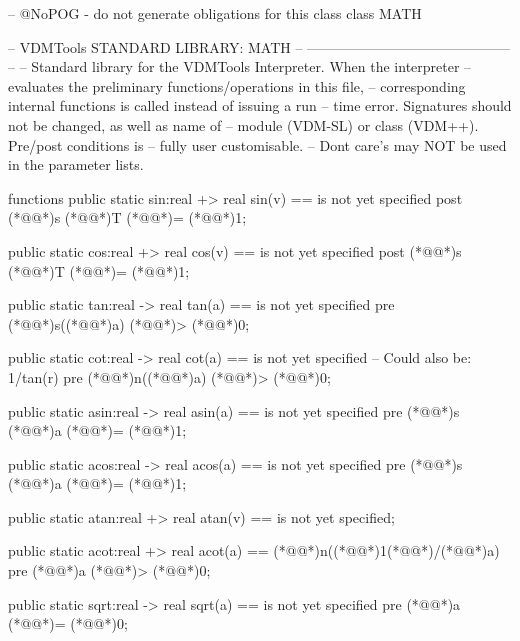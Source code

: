 \documentclass[a4paper]{article}
\begin{document}
\title{}
\author{}
\begin{vdm_al}
-- @NoPOG - do not generate obligations for this class
class MATH

--  VDMTools STANDARD LIBRARY: MATH
--      --------------------------------------------
-- 
-- Standard library for the VDMTools Interpreter. When the interpreter
-- evaluates the preliminary functions/operations in this file,
-- corresponding internal functions is called instead of issuing a run
-- time error. Signatures should not be changed, as well as name of
-- module (VDM-SL) or class (VDM++). Pre/post conditions is 
-- fully user customisable. 
-- Dont care's may NOT be used in the parameter lists.

  functions
public static
    sin:real +> real
    sin(v) ==
    is not yet specified    
    post (*@@*)s (*@@*)T (*@\vdmnotcovered{<}@*)= (*@\vdmnotcovered{}@*)1;

public static
    cos:real +> real
    cos(v) ==
    is not yet specified
    post (*@@*)s (*@@*)T (*@\vdmnotcovered{<}@*)= (*@\vdmnotcovered{}@*)1;

public static
    tan:real -> real
    tan(a) ==
    is not yet specified
    pre (*@@*)s((*@\vdmnotcovered{}@*)a) (*@\vdmnotcovered{<}@*)> (*@\vdmnotcovered{}@*)0;

public static
    cot:real -> real 
    cot(a) ==
    is not yet specified -- Could also be: 1/tan(r)
    pre (*@@*)n((*@\vdmnotcovered{}@*)a) (*@\vdmnotcovered{<}@*)> (*@\vdmnotcovered{}@*)0;

public static
    asin:real -> real
    asin(a) ==
    is not yet specified
    pre (*@@*)s (*@\vdmnotcovered{}@*)a (*@\vdmnotcovered{<}@*)= (*@\vdmnotcovered{}@*)1;

public static
    acos:real -> real
    acos(a) ==
    is not yet specified
    pre (*@@*)s (*@\vdmnotcovered{}@*)a (*@\vdmnotcovered{<}@*)= (*@\vdmnotcovered{}@*)1;

public static
    atan:real +> real
    atan(v) ==
    is not yet specified;

public static
    acot:real +> real
    acot(a) ==
    (*@@*)n((*@\vdmnotcovered{}@*)1(*@\vdmnotcovered{}@*)/(*@\vdmnotcovered{}@*)a)
    pre (*@\vdmnotcovered{}@*)a (*@\vdmnotcovered{<}@*)> (*@\vdmnotcovered{}@*)0;

public static
    sqrt:real -> real
    sqrt(a) ==
    is not yet specified
    pre (*@\vdmnotcovered{}@*)a (*@\vdmnotcovered{>}@*)= (*@\vdmnotcovered{}@*)0;


\end{vdm_al}
\end{document}
